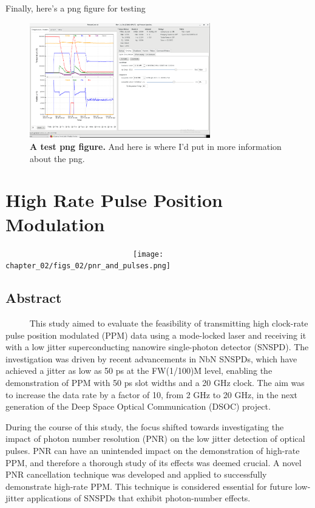 \documentclass[12pt]{caltech_thesis}
\begin{document}
Finally, here's a png figure for testing

\hypertarget{fig:test_png_figure}{%
\begin{figure}
\centering
\includegraphics[width=0.7\textwidth,height=\textheight]{chapter_01/figs_01/fridge.png}
\caption[{A png figure.}]{\textbf{A test png figure.} And here is where
I'd put in more information about the png.}
\label{fig:test_png_figure}
\end{figure}
}

\hypertarget{high-rate-pulse-position-modulation}{%
\chapter{High Rate Pulse Position
Modulation}\label{high-rate-pulse-position-modulation}}

~~~~~~~~~~~~~~~~~~~~~~~~~~~~~~\texttt{[image: chapter\_02/figs\_02/pnr\_and\_pulses.png]}

\hypertarget{abstract-1}{%
\section{Abstract}\label{abstract-1}}

~~~~~ This study aimed to evaluate the feasibility of transmitting high
clock-rate pulse position modulated (PPM) data using a mode-locked laser
and receiving it with a low jitter superconducting nanowire
single-photon detector (SNSPD). The investigation was driven by recent
advancements in NbN SNSPDs, which have achieved a jitter as low as 50 ps
at the FW(1/100)M level, enabling the demonstration of PPM with 50 ps
slot widths and a 20 GHz clock. The aim was to increase the data rate by
a factor of 10, from 2 GHz to 20 GHz, in the next generation of the Deep
Space Optical Communication (DSOC) project.

During the course of this study, the focus shifted towards investigating
the impact of photon number resolution (PNR) on the low jitter detection
of optical pulses. PNR can have an unintended impact on the
demonstration of high-rate PPM, and therefore a thorough study of its
effects was deemed crucial. A novel PNR cancellation technique was
developed and applied to successfully demonstrate high-rate PPM. This
technique is considered essential for future low-jitter applications of
SNSPDs that exhibit photon-number effects.
\end{document}

